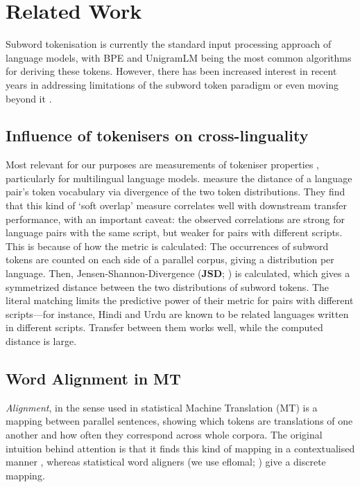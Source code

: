 \section{Related Work}
Subword tokenisation is currently the standard input processing approach of language models, with BPE \citep{sennrich-etal-2016-neural} and UnigramLM \citep{kudo-2018-subword} being the most common algorithms for deriving these tokens.
However, there has been increased interest in recent years in addressing limitations of the subword token paradigm \citep[e.g.,][]{alkaoud-syed-2020-importance, hofmann-etal-2022-embarrassingly, schmidt2024tokenizationcompression}
or even moving beyond it \citep[e.g.,][]{xue-etal-2022-byt5, mofijul-islam-etal-2022-vocabulary}.

\subsection{Influence of tokenisers on cross-linguality}\label{subsec:related-tokenisation}

Most relevant for our purposes are measurements of tokeniser properties
\citep[e.g.,][]{zouhar-etal-2023-tokenization, batsuren2024evaluatingsubwordtokenizationalien}, particularly for multilingual language models.
\citet{limisiewicz-etal-2023-tokenization} measure the distance of a language pair's token vocabulary via
divergence of the two token distributions.
They find that this kind of `soft overlap' measure correlates well with downstream transfer performance, with an important caveat: the observed correlations are strong for language pairs with the same script, but weaker for pairs with different scripts.
%
This is because of how the metric is calculated:
The occurrences of subword tokens are counted on each side of a parallel corpus, giving a distribution per language.
Then, Jensen-Shannon-Divergence (\textbf{JSD}; \citealp{lin2006divergence}) is calculated, which gives a symmetrized distance between the two distributions of subword tokens.
The literal matching limits the predictive power of their metric for pairs with different scripts---for instance, Hindi and Urdu are known to be related languages written in different scripts.
Transfer between them works well, while the computed distance is large.


\subsection{Word Alignment in MT}

\textit{Alignment}, in the sense used in statistical Machine Translation (MT) \citep{brown93:tmo} is
a mapping between parallel sentences, showing which tokens are translations of one another and how often they correspond across whole corpora.
The original intuition behind attention is that it finds this kind of mapping in a contextualised manner \citep{bahdanau2015attention},
whereas statistical word aligners
(we use eflomal; \citealp{oestling-tiedemann-2016-efficientWA}) give a discrete mapping.